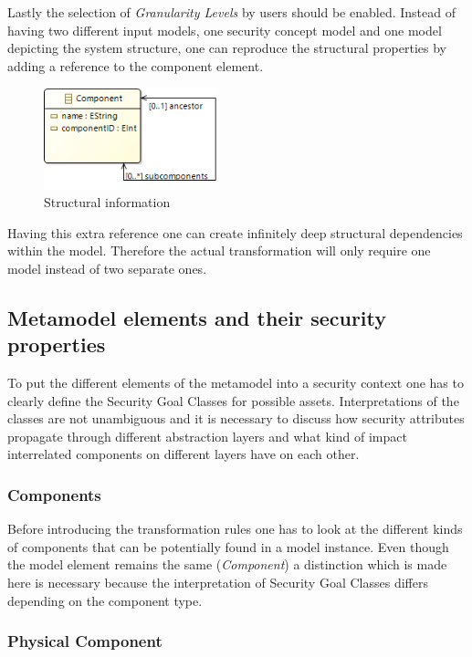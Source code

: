 Lastly the selection of \textit{Granularity Levels} by users should be enabled. Instead of having two different input models, one security concept model and one model depicting the system structure, one can reproduce the structural properties by adding a reference to the component element.      

\begin{figure}[H]
\centering
\includegraphics[width=0.45\textwidth]{pictures/component_structure.png}
\caption{Structural information}
\label{fig:data}
\end{figure} 

Having this extra reference one can create infinitely deep structural dependencies within the model. Therefore the actual transformation will only require one model instead of two separate ones.

\subsection{Metamodel elements and their security properties}
To put the different elements of the metamodel into a security context one has to clearly define the Security Goal Classes for possible assets. Interpretations of the classes are not unambiguous and it is necessary to discuss how security attributes propagate through different abstraction layers and what kind of impact interrelated components on different layers have on each other. 

\subsubsection{Components}

Before introducing the transformation rules one has to look at the different kinds of components that can be potentially found in a model instance. Even though the model element remains the same (\textit{Component}) a distinction which is made here is necessary because the interpretation of Security Goal Classes differs depending on the component type. 

\subsubsection*{Physical Component}


